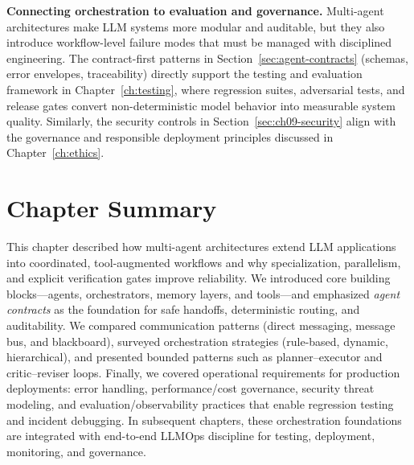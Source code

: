 
\medskip
\noindent\textbf{Connecting orchestration to evaluation and governance.}
Multi-agent architectures make LLM systems more modular and auditable, but they also introduce workflow-level failure modes that must be managed with disciplined engineering.
The contract-first patterns in Section~\ref{sec:agent-contracts} (schemas, error envelopes, traceability) directly support the testing and evaluation framework in Chapter~\ref{ch:testing}, where regression suites, adversarial tests, and release gates convert non-deterministic model behavior into measurable system quality.
Similarly, the security controls in Section~\ref{sec:ch09-security} align with the governance and responsible deployment principles discussed in Chapter~\ref{ch:ethics}.

\section*{Chapter Summary}
This chapter described how multi-agent architectures extend LLM applications into coordinated, tool-augmented workflows and why specialization, parallelism, and explicit verification gates improve reliability.
We introduced core building blocks---agents, orchestrators, memory layers, and tools---and emphasized \emph{agent contracts} as the foundation for safe handoffs, deterministic routing, and auditability.
We compared communication patterns (direct messaging, message bus, and blackboard), surveyed orchestration strategies (rule-based, dynamic, hierarchical), and presented bounded patterns such as planner--executor and critic--reviser loops.
Finally, we covered operational requirements for production deployments: error handling, performance/cost governance, security threat modeling, and evaluation/observability practices that enable regression testing and incident debugging.
In subsequent chapters, these orchestration foundations are integrated with end-to-end LLMOps discipline for testing, deployment, monitoring, and governance.

